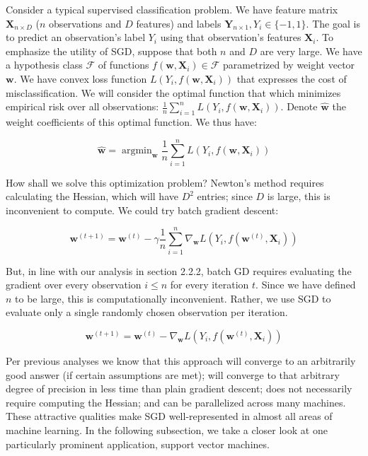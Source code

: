 \documentclass{report}
\DeclareMathOperator*{\argmin}{argmin}
\begin{document}
Consider a typical supervised classification problem. We have
feature matrix $\bm{X}_{n \times D}$ ($n$ observations and $D$
features) and labels $\bm{Y}_{n \times 1}, Y_i \in \{-1, 1\}$. The goal is to
predict an observation's label $Y_i$ using that observation's features
$\bm{X}_i$. To emphasize the utility of SGD, suppose that both $n$ and $D$ are
very large.
We have a hypothesis class $\mathcal{F}$ of functions $f(\bm{w}, \bm{X}_i) \in \mathcal{F}$ parametrized by weight
vector $\bm{w}$. We have convex loss function $L(Y_i, f(\bm{w}, \bm{X}_i))$ that
expresses the cost of misclassification. 
We will consider the optimal function
that which minimizes empirical risk over all observations: $\frac{1}{n}
\sum_{i=1}^n L(Y_i, f(\bm{w}, \bm{X}_i))$.
Denote $\hat{\bm{w}}$ the weight coefficients of this optimal function. We thus
have:

\begin{equation}
	\hat{\bm{w}} = \argmin_{\bm{w}}\frac{1}{n} \sum_{i=1}^n L(Y_i, f(\bm{w}, \bm{X}_i))
\end{equation}

How shall we solve this optimization problem? Newton's method requires
calculating the Hessian, which will have $D^2$ entries; since $D$ is large,
this is inconvenient to compute. We could try batch gradient descent:

\begin{equation}
	\bm{w}^{(t+1)} = \bm{w}^{(t)} - \gamma \frac{1}{n}\sum_{i=1}^n
	\nabla_{\bm{w}} L(Y_i, f(\bm{w}^{(t)}, \bm{X}_i))
\end{equation}

But, in line with our analysis in section 2.2.2, batch GD requires evaluating
the gradient over every observation $i \leq n$ for every iteration $t$. Since we have defined $n$ to be
large, this is computationally inconvenient. Rather, we use SGD to evaluate only
a single randomly chosen observation per iteration.

\begin{equation}
	\bm{w}^{(t+1)} = \bm{w}^{(t)} - \nabla_{\bm{w}} L(Y_i, f(\bm{w}^{(t)}, \bm{X}_i))
\end{equation}

Per previous analyses we know that this approach will converge to an arbitrarily
good answer (if certain assumptions are met); will converge to that arbitrary
degree of precision in less time than plain gradient descent; does not
necessarily require computing the Hessian; and can be parallelized across many
machines. These attractive qualities make SGD well-represented in almost all areas of
machine learning. In the following subsection, we take a closer look at one
particularly prominent application, support vector machines.
\end{document}
